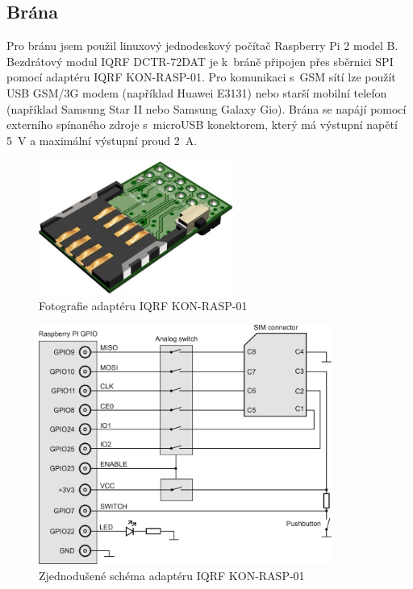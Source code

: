 \documentclass[12pt,a4paper,oneside]{article}
\begin{document}
\newpage

\subsection{Brána}

Pro bránu jsem použil linuxový jednodeskový počítač Raspberry Pi 2 model B. Bezdrátový modul IQRF DCTR-72DAT je k~bráně připojen přes sběrnici SPI pomocí adaptéru IQRF KON-RASP-01. Pro komunikaci s~GSM sítí lze použít USB GSM/3G modem (například Huawei E3131) nebo starší mobilní telefon (například Samsung Star II nebo Samsung Galaxy Gio). Brána se napájí pomocí externího spínaného zdroje s~microUSB konektorem, který má výstupní napětí 5~V a maximální výstupní proud 2~A.

\begin{figure}[H]
\centering
\label{fig:iqrf/fotka-kon-rasp-01}
\includegraphics[width = 64mm]{img/iqrf/kon-rasp-01.png}
\caption{Fotografie adaptéru IQRF KON-RASP-01}
\end{figure}

\begin{figure}[H]
\centering
\label{fig:iqrf/zjednodusene-schema-kon-rasp-01}
\includegraphics[width = 96mm]{img/iqrf/kon-rasp-01-zjednodusene-schema.png}
\caption{Zjednodušené schéma adaptéru IQRF KON-RASP-01}
\end{figure}
\end{document}
